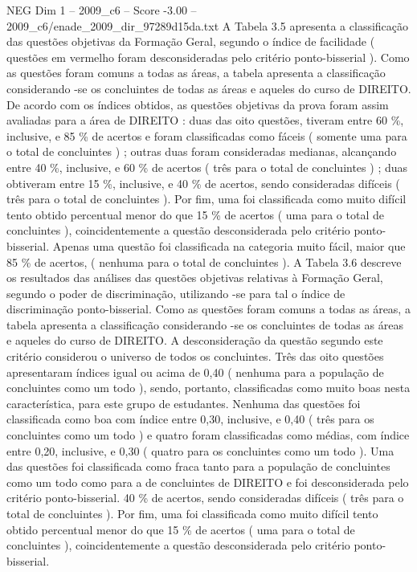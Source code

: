 \begin{textsample}{NEG Dim 1 – 2009\_c6 – Score -3.00 – 2009\_c6/enade\_2009\_dir\_97289d15da.txt}
A Tabela 3.5 apresenta a classificação das questões objetivas da Formação Geral, segundo o índice de facilidade ( questões em vermelho foram desconsideradas pelo critério ponto-bisserial ).
Como as questões foram comuns a todas as áreas, a tabela apresenta a classificação considerando -se os concluintes de todas as áreas e aqueles do curso de DIREITO.
De acordo com os índices obtidos, as questões objetivas da prova foram assim avaliadas para a área de DIREITO : duas das oito questões, tiveram entre 60 \%, inclusive, e 85 \% de acertos e foram classificadas como fáceis ( somente uma para o total de concluintes ) ; outras duas foram consideradas medianas, alcançando entre 40 \%, inclusive, e 60 \% de acertos ( três para o total de concluintes ) ; duas obtiveram entre 15 \%, inclusive, e 40 \% de acertos, sendo consideradas difíceis ( três para o total de concluintes ).
Por fim, uma foi classificada como muito difícil tento obtido percentual menor do que 15 \% de acertos ( uma para o total de concluintes ), coincidentemente a questão desconsiderada pelo critério ponto-bisserial.
Apenas uma questão foi classificada na categoria muito fácil, maior que 85 \% de acertos, ( nenhuma para o total de concluintes ).
A Tabela 3.6 descreve os resultados das análises das questões objetivas relativas à Formação Geral, segundo o poder de discriminação, utilizando -se para tal o índice de discriminação ponto-bisserial.
Como as questões foram comuns a todas as áreas, a tabela apresenta a classificação considerando -se os concluintes de todas as áreas e aqueles do curso de DIREITO.
A desconsideração da questão segundo este critério considerou o universo de todos os concluintes.
Três das oito questões apresentaram índices igual ou acima de 0,40 ( nenhuma para a população de concluintes como um todo ), sendo, portanto, classificadas como muito boas nesta característica, para este grupo de estudantes.
Nenhuma das questões foi classificada como boa com índice entre 0,30, inclusive, e 0,40 ( três para os concluintes como um todo ) e quatro foram classificadas como médias, com índice entre 0,20, inclusive, e 0,30 ( quatro para os concluintes como um todo ).
Uma das questões foi classificada como fraca tanto para a população de concluintes como um todo como para a de concluintes de DIREITO e foi desconsiderada pelo critério ponto-bisserial. 40 \% de acertos, sendo consideradas difíceis ( três para o total de concluintes ).
Por fim, uma foi classificada como muito difícil tento obtido percentual menor do que 15 \% de acertos ( uma para o total de concluintes ), coincidentemente a questão desconsiderada pelo critério ponto-bisserial.

\end{textsample}
